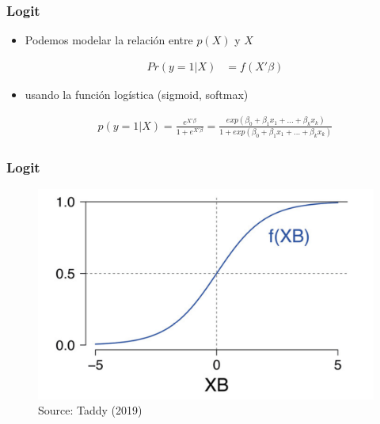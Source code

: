 \documentclass[
  shownotes,
  xcolor={svgnames},
  hyperref={colorlinks,citecolor=DarkBlue,linkcolor=DarkRed,urlcolor=DarkBlue}
  , aspectratio=169]{beamer}
\begin{document}
\begin{frame}[fragile]
\frametitle{Logit}

\begin{itemize}
  \item Podemos modelar la relación entre $p(X)$ y $X$

    \begin{align}
    Pr(y=1|X) &= f(X'\beta) 
    \end{align}

  \item usando la función logística  (sigmoid, softmax) 

  \begin{align}
  p(y=1|X)=\frac{e^{X'\beta}}{1+e^{X'\beta}}=\frac{exp(\beta_0 +\beta_1 x_1 + \dots +\beta_k x_k)}{1+exp(\beta_0 +\beta_1 x_1 + \dots +\beta_k x_k)}
  \end{align}
\end{itemize}
\end{frame}
\begin{frame}[fragile]
\frametitle{Logit}



        \begin{figure}[H] \centering
            \captionsetup{justification=centering}
              \includegraphics[scale=0.2]{figures/logistic}
              \\
              \tiny
              Source: Taddy (2019)
 \end{figure}

\end{frame}
\end{document}
